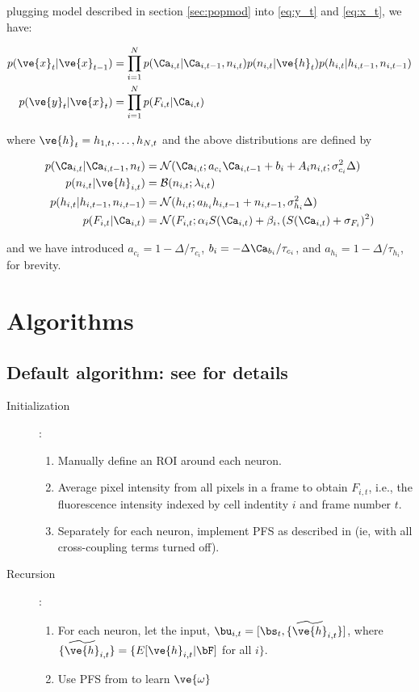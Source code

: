 \documentclass[12pt]{article}
\newcommand{\x}{\ve{x}}
\newcommand{\y}{\ve{y}}
\newcommand{\h}{\ve{h}}
\begin{document}
plugging model described in section \ref{sec:popmod} into \eqref{eq:y_t} and \eqref{eq:x_t}, we have:

\begin{align}
p(\x_t | \x_{t-1}) &= \prod_{i=1}^N p(\Ca_{i,t} | \Ca_{i,t-1}, n_{i,t}) p(n_{i,t} | \h_t) p(h_{i,t} | h_{i,t-1}, n_{i,t-1})\\
p(\y_t | \x_t) &= \prod_{i=1}^N p(F_{i,t} | \Ca_{i,t})
\end{align}

\noindent where $\h_t=h_{1,t}, \ldots, h_{N,t}$ and the above distributions are defined by

\begin{align}
p(\Ca_{i,t} | \Ca_{i,t-1}, n_t) &= \mathcal{N}(\Ca_{i,t}; a_{c_i} \Ca_{i,t-1} + b_i + A_i n_{i,t}; \sigma_{c_i}^2 \Delta) \\
p(n_{i,t} | \h_{i,t}) &= \mathcal{B}(n_{i,t}; \lambda_{i,t}) \\
p(h_{i,t} | h_{i,t-1}, n_{i,t-1}) &= \mathcal{N}(h_{i,t}; a_{h_i} h_{i,t-1} + n_{i,t-1}, \sigma_{h_i}^2 \Delta)\\
p(F_{i,t} | \Ca_{i,t}) &= \mathcal{N}(F_{i,t}; \alpha_i S(\Ca_{i,t}) + \beta_i, (S(\Ca_{i,t}) + \sigma_{F_i})^2)
\end{align}

\noindent and we have introduced $a_{c_i}=1-\Delta/\tau_{c_i}$, $b_i=-\Delta \Ca_{b_i} / \tau_{c_i}$, and $a_{h_i}=1- \Delta / \tau_{h_i}$, for brevity.

\section{Algorithms}

\subsection{Default algorithm: see \cite{BJ08} for details} \label{sec:default}

\begin{description}
\item[Initialization]: \\
\begin{enumerate}
\item Manually define an ROI around each neuron.
\item Average pixel intensity from all pixels in a frame to obtain $F_{i,t}$, i.e., the fluorescence intensity indexed by cell indentity $i$ and frame number $t$.
\item Separately for each neuron, implement PFS as described in \cite{BJ08} (ie, with all cross-coupling terms turned off). 
\end{enumerate}
\item[Recursion]: \\
\begin{enumerate}
\item For each neuron, let the input, $\bu_{i,t} = [\bs_t, \{\widetilde{\h}_{i,t}\}]$, where $\{\widetilde{\h}_{i,t}\}= \{E[\h_{i,t} | \bF]$ for all $i\}$.
\item Use PFS from \cite{BJ08} to learn $\ve{\omega}$ 
\end{enumerate}
\end{description}
\end{document}

